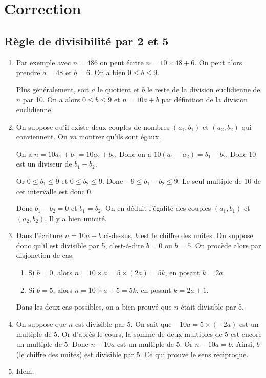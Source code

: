 \documentclass[a4paper,12pt, french, noSujetB]{article}
\begin{document}
\newpage
\section*{Correction}
\subsection*{Règle de divisibilité par 2 et 5}
\begin{enumerate} 
	\item Par exemple avec $n=486$ on peut écrire $n=10\times 48 +6$. On peut alors prendre $a=48$ et $b=6$. On a bien $0\le b \le 9$. 

	Plus généralement, soit $a$ le quotient et $b$ le reste de la division euclidienne de $n$ par 10. On a alors $0\le b\le9$ et $n=10a+b$ par définition de la division euclidienne.
	\item On suppose qu'il existe deux couples de nombres $(a_1, b_1)$ et $(a_2, b_2)$ qui conviennent. On va montrer qu'ils sont égaux. 
	
	On a $n=10a_1+b_1=10a_2+b_2$. Donc on a $10(a_1-a_2)=b_1-b_2$. Donc 10 est un diviseur de $b_1-b_2$. 
	
	Or $0\le b_1\le9$ et  $0\le b_2\le9$. Donc $-9\le b_1-b_2 \le 9$. Le seul multiple de 10 de cet intervalle est donc 0.
	
	Donc $b_1-b_2=0$ et $b_1=b_2$. On en déduit l'égalité des couples $(a_1, b_1)$ et $(a_2, b_2)$. Il y a bien unicité.
	\item Dans l'écriture $n=10a+b$ ci-dessus, $b$ est le chiffre des unités. On suppose donc qu'il est divisible par 5, c'est-à-dire $b=0$ ou $b=5$. On procède alors par disjonction de cas. 
	
	\begin{enumerate}[label=(\roman*)]
		\item Si $b=0$, alors $n=10\times a=5\times (2a) = 5k$, en posant $k=2a$. 
		\item Si $b=5$, alors $n=10\times a +5 = 5k$, en posant $k=2a+1$.
	\end{enumerate}
	Dans les deux cas possibles, on a bien prouvé que $n$ était divisible par 5.

	\item On suppose que $n$ est divisible par $5$. On sait que $-10a=5\times(-2a)$ est un multiple de 5. Or d'après le cours, la somme de deux multiples de 5 est encore un multiple de 5. Donc $n-10a$ est un multiple de 5. Or $n-10a = b$. Ainsi, $b$ (le chiffre des unités) est divisible par 5. Ce qui prouve le sens réciproque.
	\item Idem.
\end{enumerate}
\end{document}

